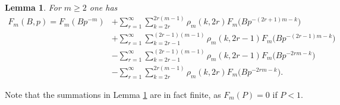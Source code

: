 \documentclass[JEP,XML,SOM,Unicode,published]{cedram}
\newtheorem{lemma}[theorem]{Lemma}
\theoremstyle{definition}
\numberwithin{theorem}{section}
\begin{document}
\begin{lemma}\label{lem5}
For $m\geq 2$ one has
\begin{equation*}
\begin{split}
F_m(B,p) = F_m(Bp^{-m}) &+\sum_{r=1}^{\infty} \sum_{k=2r}^{2r(m-1)}\rho_m(k,2r)F_m\bigl(Bp^{-(2r+1)m-k}\bigr)\\
&+ \sum_{r=1}^\infty\sum_{k=2r-1}^{(2r-1)(m-1)}\rho_m(k,2r-1)F_m\bigl(Bp^{-(2r-1)m-k}\bigr)\\
&-\sum_{r=1}^\infty \sum_{k=2r-1}^{(2r-1)(m-1)}\rho_m(k,2r-1)F_m\bigl(Bp^{-2rm-k}\bigr)\\
&-\sum_{r=1}^\infty\sum_{k=2r}^{2r(m-1)}\rho_m(k,2r)F_m\bigl(Bp^{-2rm-k}\bigr).
\end{split}
\end{equation*}

\end{lemma}

Note that the summations in Lemma \ref{lem5} are in fact finite, as $F_m(P)=0$ if $P<1$.
\end{document}
